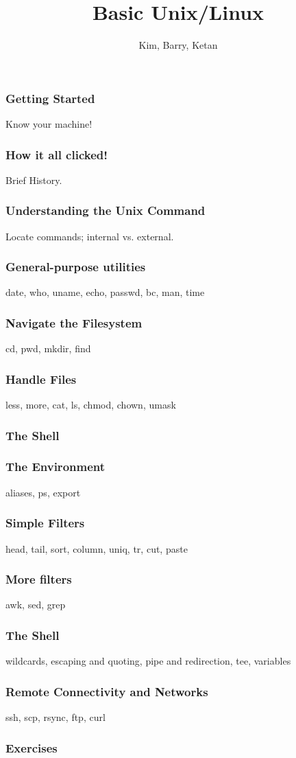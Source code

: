 \documentclass[hyperref={pdfpagelabels=false},12pt]{beamer}
\title[Basic Unix/Linux]{{Basic Unix/Linux}}
\author[Basic Unix/Linux]{{Kim, Barry, Ketan}}
\date{}
\begin{document}
\begin{frame}[plain]
\titlepage
\end{frame}

\begin{frame}
\frametitle{Getting Started}
Know your machine!
\end{frame}

\begin{frame}
\frametitle{How it all clicked!}
Brief History.
\end{frame}

\begin{frame}
\frametitle{Understanding the Unix Command}
Locate commands; internal vs. external.
\end{frame}

\begin{frame}
\frametitle{General-purpose utilities}
date, who, uname, echo, passwd, bc, man, time
\end{frame}

\begin{frame}
\frametitle{Navigate the Filesystem}
cd, pwd, mkdir, find
\end{frame}

\begin{frame}
\frametitle{Handle Files}
less, more, cat, ls, chmod, chown, umask
\end{frame}

\begin{frame}
\frametitle{The Shell}
\end{frame}

\begin{frame}
\frametitle{The Environment}
aliases, ps, export
\end{frame}

\begin{frame}
\frametitle{Simple Filters}
head, tail, sort, column, uniq, tr, cut, paste 
\end{frame}

\begin{frame}
\frametitle{More filters}
awk, sed, grep
\end{frame}

\begin{frame}
\frametitle{The Shell}
wildcards, escaping and quoting, pipe and redirection, tee, variables
\end{frame}

\begin{frame}
\frametitle{Remote Connectivity and Networks}
ssh, scp, rsync, ftp, curl
\end{frame}

\begin{frame}
\frametitle{Exercises}
\end{frame}
\end{document}
